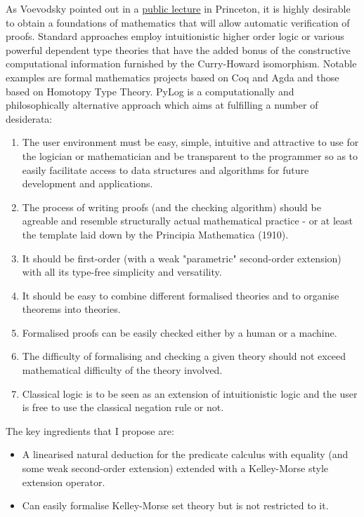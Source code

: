 \documentclass[12pt,leqno]{article}
\numberwithin{equation}{section}
\begin{document}
 As Voevodsky pointed out in a \href{https://www.youtube.com/watch?v=E9RiR9AcXeE}{public lecture} in Princeton,
 it is highly desirable to obtain a foundations of mathematics that will allow automatic verification of proofs. Standard approaches employ intuitionistic higher order logic or various powerful dependent type theories  that have the added bonus of
 the constructive computational information furnished by the  Curry-Howard isomorphism. Notable examples
 are formal mathematics projects based on Coq and Agda and those based on Homotopy Type Theory.
 PyLog is a computationally and philosophically alternative approach which aims at fulfilling a number of desiderata:
 \begin{enumerate}
 	\item The user environment must be easy, simple, intuitive and attractive to use for the  logician or mathematician and be transparent to the programmer so as to easily facilitate access to data structures and algorithms for future development and applications.
 	\item The process of writing proofs (and the checking algorithm) should be agreable and resemble structurally actual mathematical practice - or at least the template laid down by the Principia Mathematica (1910).
 	\item It should be first-order (with a weak "parametric" second-order extension) with all its type-free simplicity and versatility.
 	\item It should be easy to combine different formalised theories and to organise theorems into theories.
 	\item Formalised proofs  can be easily checked either by a human or a machine.
 	\item The difficulty of formalising and checking a given theory should not exceed mathematical difficulty of the theory involved.
 	\item Classical logic is to be seen as an extension of intuitionistic logic and the user is free to use the classical negation rule or not.
 	
 \end{enumerate}
 
 
 The key ingredients that I propose are:
 
 \begin{itemize}
 	\item A linearised natural deduction for the predicate calculus with equality (and some weak second-order extension) extended with
 	a Kelley-Morse style extension operator.
 	\item Can easily formalise Kelley-Morse set theory but is not restricted to it.
 \end{itemize}
 
\end{document}

